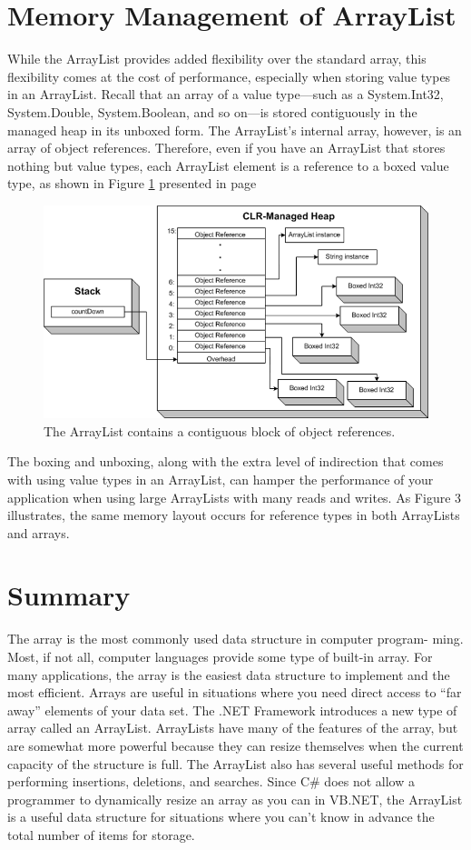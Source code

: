 \documentclass[12pt,a4paper,final,twoside,titlepage]{book}
\begin{document}
\section{Memory Management of ArrayList}
While the ArrayList provides added flexibility over the standard array, this flexibility comes at the cost of performance, especially when storing value types in an ArrayList. Recall that an array of a value type—such as a System.Int32, System.Double, System.Boolean, and so on—is stored contiguously in the managed heap in its unboxed form. The ArrayList's internal array, however, is an array of object references. Therefore, even if you have an ArrayList that stores nothing but value types, each ArrayList element is a reference to a boxed value type, as shown in Figure \ref{CLR-Value3} presented in page \pageref{CLR-Value3}
\begin{figure}
\begin{center}
\includegraphics[scale=0.5]{CLR-Value3}
\caption{The ArrayList contains a contiguous block of object references.}
\label{CLR-Value3}
\end{center}
\end{figure}
The boxing and unboxing, along with the extra level of indirection that comes with using value types in an ArrayList, can hamper the performance of your application when using large ArrayLists with many reads and writes. As Figure 3 illustrates, the same memory layout occurs for reference types in both ArrayLists and arrays.


\section{Summary}
The array is the most commonly used data structure in computer program- ming. Most, if not all, computer languages provide some type of built-in array. For many applications, the array is the easiest data structure to implement and the most efficient. Arrays are useful in situations where you need direct access to “far away” elements of your data set.
The .NET Framework introduces a new type of array called an ArrayList. ArrayLists have many of the features of the array, but are somewhat more powerful because they can resize themselves when the current capacity of the structure is full. The ArrayList also has several useful methods for performing insertions, deletions, and searches. Since C\# does not allow a programmer to dynamically resize an array as you can in VB.NET, the ArrayList is a useful data structure for situations where you can’t know in advance the total number of items for storage.
\end{document}
